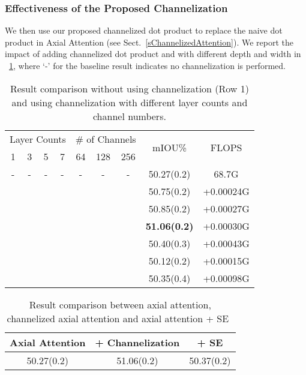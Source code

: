 \documentclass[journal]{IEEEtran}
\begin{document}
\subsubsection{Effectiveness of the Proposed Channelization}
We then use our proposed channelized dot product to replace the naive dot product in Axial Attention (see Sect.~\ref{sChannelizedAttention}). 
We report the impact of adding channelized dot product and with different depth and width in \tablename{~\ref{table:cdp}}, where `-' for the baseline result indicates no channelization is performed. 

\begin{table}[t]
	\centering
	\scriptsize
	\caption{ Result comparison without using channelization (Row 1) and using channelization with different layer counts and channel numbers.}
	\begin{tabular}{cccc|ccc|c|c} 
		\toprule[1pt]
		\multicolumn{4}{c|}{Layer Counts} &\multicolumn{3}{c|}{\# of Channels} & \multirow{2}{*}{mIOU\%} & \multirow{2}{*}{FLOPS} \\
		1  & 3 & 5 & 7& 64 & 128 & 256 &\\
		\midrule[0.5pt]
		\midrule[0.5pt]
		-& -& -& -& -& -& -& 50.27(0.2)&  68.7G\\
		\midrule
		\checkmark& & & & & \checkmark& & 50.75(0.2)& +0.00024G\\
		& \checkmark& & & & \checkmark& & 50.85(0.2) & +0.00027G\\
		& & \checkmark& & & \checkmark& & \textbf{51.06(0.2)} & +0.00030G \\
		& & & \checkmark& & \checkmark& & 50.40(0.3)  & +0.00043G \\
		\midrule
		& &\checkmark & & \checkmark& & & 50.12(0.2)& +0.00015G\\
		& & \checkmark& & & &\checkmark & 50.35(0.4) & +0.00098G \\
		\bottomrule[1pt]
	\end{tabular}
	\label{table:cdp}
\end{table}

\begin{table}[t]
    \centering
\caption{ Result comparison between axial attention, channelized axial attention and axial attention + SE~\cite{cSENet}  }
    \begin{tabular}{c|c|c}
        \toprule[1pt]
        Axial Attention& + Channelization & + SE \\
        \midrule[0.5pt]
		\midrule[0.5pt]
        50.27(0.2) & 51.06(0.2)& 50.37(0.2) \\
        \bottomrule[1pt]
    \end{tabular}
    \label{table:sedesign}
\end{table}
\end{document}
